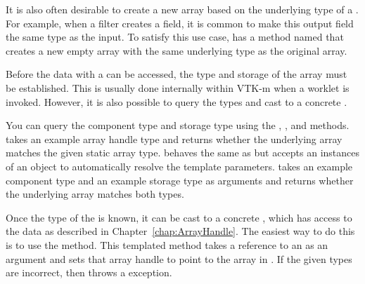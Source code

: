 It is also often desirable to create a new array based on the underlying
type of a . For example, when a filter
creates a field, it is common to make this output field the same type as
the input. To satisfy this use case, 
has a method named  that creates a new empty array
with the same underlying type as the original array.


Before the data with a  can be accessed,
the type and storage of the array must be established. This is usually done
internally within VTK-m when a worklet  is invoked.
However, it is also possible to query the types and cast to a concrete
.

You can query the component type and storage type using the
, , and
 methods.  takes an
example array handle type and returns whether the underlying array matches
the given static array type.  behaves the same as
 but accepts an instances of an
 object to automatically resolve the template
parameters.  takes an example
component type and an example storage type as arguments and returns whether
the underlying array matches both types.


Once the type of the  is known, it can
be cast to a concrete , which has access to the
data as described in Chapter~\ref{chap:ArrayHandle}. The easiest way to do
this is to use the  method. This templated method takes a
reference to an  as an argument and sets that
array handle to point to the array in .
If the given types are incorrect, then  throws
a  exception.


